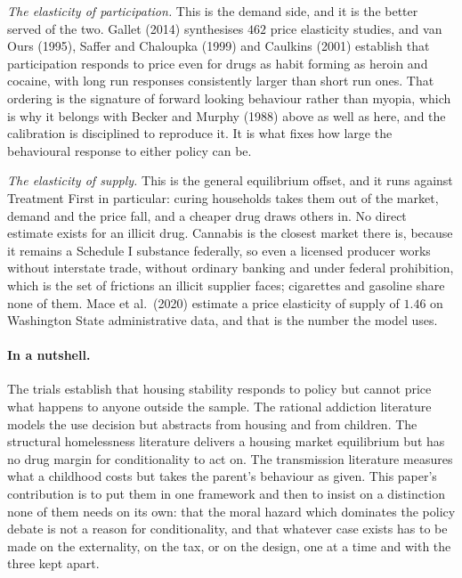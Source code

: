 \documentclass[10pt]{article}
\begin{document}
\emph{The elasticity of participation.} This is the demand side, and it is the
better served of the two. Gallet (2014) synthesises $462$ price elasticity studies,
and van Ours (1995), Saffer and Chaloupka (1999) and Caulkins (2001) establish that
participation responds to price even for drugs as habit forming as heroin and
cocaine, with long run responses consistently larger than short run ones. That
ordering is the signature of forward looking behaviour rather than myopia, which is
why it belongs with Becker and Murphy (1988) above as well as here, and the
calibration is disciplined to reproduce it. It is what fixes how large the
behavioural response to either policy can be.

\emph{The elasticity of supply.} This is the general equilibrium offset, and it
runs against Treatment First in particular: curing households takes them out of the
market, demand and the price fall, and a cheaper drug draws others in. No direct
estimate exists for an illicit drug. Cannabis is the closest market there is, because
it remains a Schedule I substance federally, so even a licensed producer works
without interstate trade, without ordinary banking and under federal prohibition,
which is the set of frictions an illicit supplier faces; cigarettes and gasoline
share none of them. Mace et al.\ (2020) estimate a price elasticity of supply of
$1.46$ on Washington State administrative data, and that is the number the model
uses.

\paragraph{In a nutshell.} The trials establish that housing stability responds to
policy but cannot price what happens to anyone outside the sample. The rational
addiction literature models the use decision but abstracts from housing and from
children. The structural homelessness literature delivers a housing market
equilibrium but has no drug margin for conditionality to act on. The transmission
literature measures what a childhood costs but takes the parent's behaviour as
given. This paper's contribution is to put them in one framework and then to insist
on a distinction none of them needs on its own: that the moral hazard which
dominates the policy debate is not a reason for conditionality, and that whatever
case exists has to be made on the externality, on the tax, or on the design, one at
a time and with the three kept apart.


\end{document}
